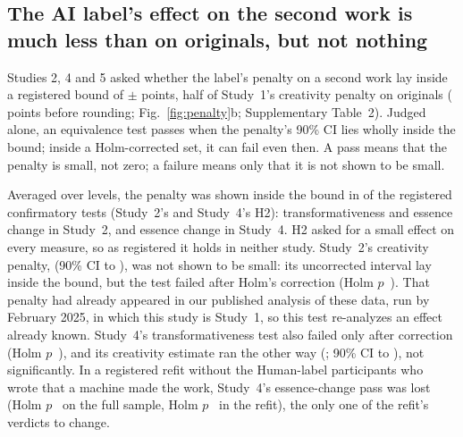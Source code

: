 \subsection*{The AI label's effect on the second work is much less than on originals, but not nothing}

Studies 2, 4 and 5 asked whether the label's penalty on a second work lay inside a registered bound of $\pm$\SourceBound{} points, half of Study~1's creativity penalty on originals (\SOneHOneCreatDiffPrecise{} points before rounding; Fig.~\ref{fig:penalty}b; Supplementary Table~2). Judged alone, an equivalence test passes when the penalty's 90\% CI lies wholly inside the bound; inside a Holm-corrected set, it can fail even then. A pass means that the penalty is small, not zero; a failure means only that it is not shown to be small.

Averaged over levels, the penalty was shown inside the bound in \NHTwoPassSTwoSFour{} of the \NHTwoTestsSTwoSFour{} registered confirmatory tests (Study~2's and Study~4's H2): transformativeness and essence change in Study~2, and essence change in Study~4. H2 asked for a small effect on every measure, so as registered it holds in neither study. Study~2's creativity penalty, \STwoCreatPenaltyEst{} (90\% CI \STwoCreatPenaltyLoNinety{} to \STwoCreatPenaltyHiNinety), was not shown to be small: its uncorrected interval lay inside the bound, but the test failed after Holm's correction (Holm $p$~\STwoCreatPenaltyPHolm). That penalty had already appeared in our published analysis of these data,\cite{kamper2025originalsin} run by February 2025, in which this study is Study~1, so this test re-analyzes an effect already known. Study~4's transformativeness test also failed only after correction (Holm $p$~\SFourTransPenaltyPHolm), and its creativity estimate ran the other way (\SFourCreatPenaltyEst; 90\% CI \SFourCreatPenaltyLoNinety{} to \SFourCreatPenaltyHiNinety), not significantly. In a registered refit without the \SFourMachineMadeN{} Human-label participants who wrote that a machine made the work, Study~4's essence-change pass was lost (Holm $p$~\SFourEssPenaltyPHolm{} on the full sample, Holm $p$~\SFourEssPenaltyPHolmRefitPrecise{} in the refit), the only one of the refit's \SFourNRefitVerdicts{} verdicts to change.

